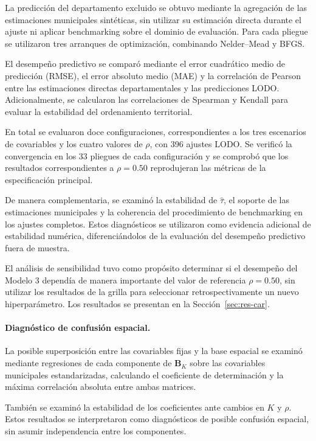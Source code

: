 La predicción del departamento excluido se obtuvo mediante la agregación de las estimaciones municipales sintéticas, sin utilizar su estimación directa durante el ajuste ni aplicar benchmarking sobre el dominio de evaluación. Para cada pliegue se utilizaron tres arranques de optimización, combinando Nelder--Mead y BFGS.

El desempeño predictivo se comparó mediante el error cuadrático medio de predicción (RMSE), el error absoluto medio (MAE) y la correlación de Pearson entre las estimaciones directas departamentales y las predicciones LODO. Adicionalmente, se calcularon las correlaciones de Spearman y Kendall para evaluar la estabilidad del ordenamiento territorial.

En total se evaluaron doce configuraciones, correspondientes a los tres escenarios de covariables y los cuatro valores de $\rho$, con 396 ajustes LODO. Se verificó la convergencia en los 33 pliegues de cada configuración y se comprobó que los resultados correspondientes a $\rho=0.50$ reprodujeran las métricas de la especificación principal.

De manera complementaria, se examinó la estabilidad de $\hat{\tau}$, el soporte de las estimaciones municipales y la coherencia del procedimiento de benchmarking en los ajustes completos. Estos diagnósticos se utilizaron como evidencia adicional de estabilidad numérica, diferenciándolos de la evaluación del desempeño predictivo fuera de muestra.

El análisis de sensibilidad tuvo como propósito determinar si el desempeño del Modelo 3 dependía de manera importante del valor de referencia $\rho=0.50$, sin utilizar los resultados de la grilla para seleccionar retrospectivamente un nuevo hiperparámetro. Los resultados se presentan en la Sección~\ref{sec:res-car}.

\paragraph{Diagnóstico de confusión espacial.}

La posible superposición entre las covariables fijas y la base espacial se examinó mediante regresiones de cada componente de $\mathbf{B}_K$ sobre las covariables municipales estandarizadas, calculando el coeficiente de determinación y la máxima correlación absoluta entre ambas matrices.

También se examinó la estabilidad de los coeficientes ante cambios en $K$ y $\rho$. Estos resultados se interpretaron como diagnósticos de posible confusión espacial, sin asumir independencia entre los componentes.

